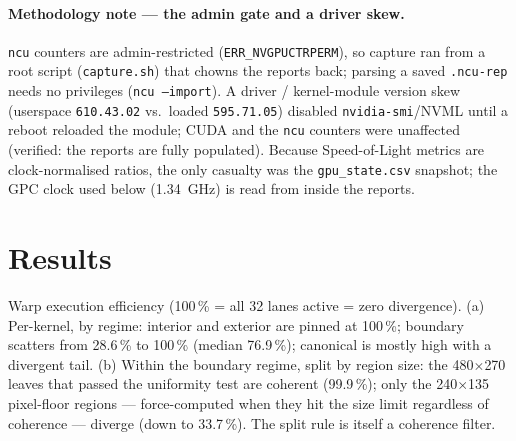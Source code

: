 \documentclass[
	english,
	letterpaper, oneside
]{article}
\begin{document}
\paragraph{Methodology note --- the admin gate and a driver skew.} \texttt{ncu}
counters are admin-restricted (\texttt{ERR\_NVGPUCTRPERM}), so capture ran from a
root script (\texttt{capture.sh}) that chowns the reports back; parsing a
saved \texttt{.ncu-rep} needs no privileges (\texttt{ncu --import}). A driver /
kernel-module version skew (userspace \texttt{610.43.02} vs.\ loaded
\texttt{595.71.05}) disabled \texttt{nvidia-smi}/NVML until a reboot reloaded the
module; CUDA and the \texttt{ncu} counters were unaffected (verified: the
reports are fully populated). Because Speed-of-Light metrics are clock-normalised
ratios, the only casualty was the \texttt{gpu\_state.csv} snapshot; the GPC clock
used below (1.34~GHz) is read from inside the reports.

\section{Results}

            {Warp execution efficiency (100\,\% = all 32 lanes active = zero
             divergence). (a) Per-kernel, by regime: interior and
             exterior are pinned at 100\,\%; boundary scatters from 28.6\,\% to
             100\,\% (median 76.9\,\%); canonical is mostly high with a divergent
             tail. (b) Within the boundary regime, split by region size:
             the 480$\times$270 leaves that passed the uniformity test are
             coherent (99.9\,\%); only the 240$\times$135 pixel-floor
             regions --- force-computed when they hit the size limit regardless of
             coherence --- diverge (down to 33.7\,\%). The split rule is itself a
             coherence filter. \label{fig:div}}
\end{document}
